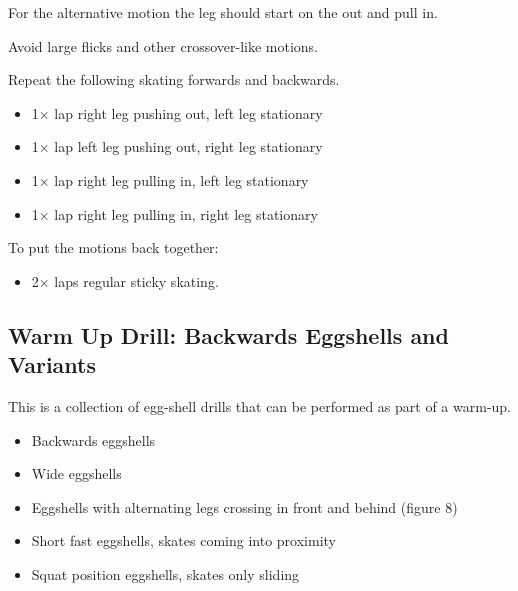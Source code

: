 For the alternative motion the leg should start on the out and pull in.   

Avoid large flicks and other crossover-like motions.    

Repeat the following skating forwards and backwards. 
\begin{itemize}
    \item 1$\times$ lap right leg pushing out, left leg stationary  
    \item 1$\times$ lap left leg pushing out, right leg stationary 
    \item 1$\times$ lap right leg pulling in, left leg stationary 
    \item 1$\times$ lap right leg pulling in, right leg stationary 
\end{itemize}

To put the motions back together:
\begin{itemize}
    \item 2$\times$ laps regular sticky skating. 
\end{itemize}


\subsection*{Warm Up Drill: Backwards Eggshells and Variants}
\label{drill:sticky/backwards/warm_up}

This is a collection of egg-shell drills that can be performed as part of a warm-up. 

\begin{itemize}
    \item Backwards eggshells  
    \item Wide eggshells
    \item Eggshells with alternating legs crossing in front and behind (figure 8) 
    \item Short fast eggshells, skates coming into proximity 
    \item Squat position eggshells, skates only sliding    
\end{itemize}
